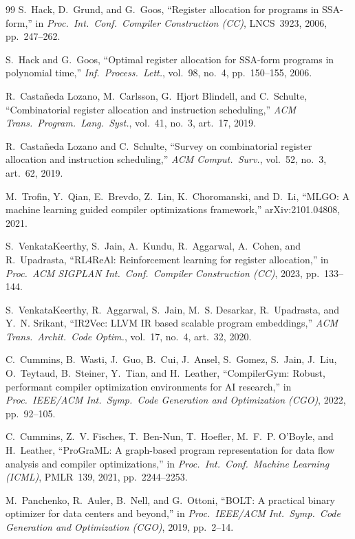 \documentclass[conference]{IEEEtran}
\begin{document}
\begin{thebibliography}{99}
S.~Hack, D.~Grund, and G.~Goos, ``Register allocation for programs in
SSA-form,'' in \emph{Proc.\ Int.\ Conf.\ Compiler Construction (CC)},
LNCS~3923, 2006, pp.~247--262.

S.~Hack and G.~Goos, ``Optimal register allocation for SSA-form
programs in polynomial time,'' \emph{Inf.\ Process.\ Lett.}, vol.~98,
no.~4, pp.~150--155, 2006.

R.~Castañeda Lozano, M.~Carlsson, G.~Hjort Blindell, and C.~Schulte,
``Combinatorial register allocation and instruction scheduling,''
\emph{ACM Trans.\ Program.\ Lang.\ Syst.}, vol.~41, no.~3, art.~17,
2019.

R.~Castañeda Lozano and C.~Schulte, ``Survey on combinatorial register
allocation and instruction scheduling,'' \emph{ACM Comput.\ Surv.},
vol.~52, no.~3, art.~62, 2019.

M.~Trofin, Y.~Qian, E.~Brevdo, Z.~Lin, K.~Choromanski, and D.~Li,
``MLGO: A machine learning guided compiler optimizations framework,''
arXiv:2101.04808, 2021.

S.~VenkataKeerthy, S.~Jain, A.~Kundu, R.~Aggarwal, A.~Cohen, and
R.~Upadrasta, ``RL4ReAl: Reinforcement learning for register
allocation,'' in \emph{Proc.\ ACM SIGPLAN Int.\ Conf.\ Compiler
Construction (CC)}, 2023, pp.~133--144.

S.~VenkataKeerthy, R.~Aggarwal, S.~Jain, M.~S. Desarkar, R.~Upadrasta,
and Y.~N. Srikant, ``IR2Vec: LLVM IR based scalable program
embeddings,'' \emph{ACM Trans.\ Archit.\ Code Optim.}, vol.~17, no.~4,
art.~32, 2020.

C.~Cummins, B.~Wasti, J.~Guo, B.~Cui, J.~Ansel, S.~Gomez, S.~Jain,
J.~Liu, O.~Teytaud, B.~Steiner, Y.~Tian, and H.~Leather, ``CompilerGym:
Robust, performant compiler optimization environments for AI
research,'' in \emph{Proc.\ IEEE/ACM Int.\ Symp.\ Code Generation and
Optimization (CGO)}, 2022, pp.~92--105.

C.~Cummins, Z.~V. Fisches, T.~Ben-Nun, T.~Hoefler, M.~F.~P. O'Boyle,
and H.~Leather, ``ProGraML: A graph-based program representation for
data flow analysis and compiler optimizations,'' in \emph{Proc.\ Int.\
Conf.\ Machine Learning (ICML)}, PMLR~139, 2021, pp.~2244--2253.

M.~Panchenko, R.~Auler, B.~Nell, and G.~Ottoni, ``BOLT: A practical
binary optimizer for data centers and beyond,'' in \emph{Proc.\
IEEE/ACM Int.\ Symp.\ Code Generation and Optimization (CGO)}, 2019,
pp.~2--14.


\end{thebibliography}
\end{document}
